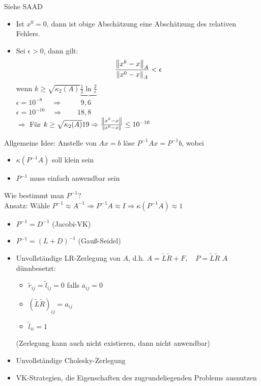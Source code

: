 \beweis Siehe SAAD
\begin{itemize}
  \item Ist $x^0 = 0$, dann ist obige Abschätzung eine Abschätzung des relativen Fehlers.
  \item Sei $\epsilon > 0$, dann gilt:
  \begin{align*}
    \frac{\left\lVert x^k - x \right\rVert_A}{\left\lVert x^0 - x \right\rVert_A} < \epsilon
  \end{align*}
  wenn $k \geq \sqrt{\kappa_2(A)} \underbrace{\frac{1}{2} \ln \frac{2}{\epsilon}}$\\
  $\epsilon = 10^{-8} \;\quad\Rightarrow\qquad \;\;9,6$\\
  $\epsilon = 10^{-16} \quad\Rightarrow\qquad 18,8$\\
  $\Rightarrow$ Für $k \geq \sqrt{\kappa_2(A)}19 \Rightarrow \frac{\left\lVert x^k - x \right\rVert}{\left\lVert x^0 - x \right\rVert} \leq 10^{-16}$
\end{itemize}
Allgemeine Idee: Anstelle von $Ax = b$ löse $P^{-1}Ax = P^{-1}b$, wobei
\begin{itemize}
  \item $\kappa(P^{-1}A)$ soll klein sein
  \item $P^{-1}$ muss einfach anwendbar sein
\end{itemize}
Wie bestimmt man $P^{-1}$?\\
Ansatz: Wähle $P^{-1}\approx A^{-1} \Rightarrow P^{-1}A \approx I \Rightarrow \kappa(P^{-1}A) \approx 1$
\begin{itemize}
  \item $P^{-1} = D^{-1}$ (Jacobi-VK)
  \item $P^{-1} = (L + D)^{-1}$ (Gauß-Seidel)
  \item Unvollständige LR-Zerlegung von $A$, d.h. $A = \tilde{L}\tilde{R} + F, \quad P = \tilde{L}\tilde{R}$ $A$ dünnbesetzt:
    \begin{itemize}
      \item $\tilde{r}_{ij} = \tilde{l}_{ij} = 0$ falls $a_{ij} = 0$
      \item $(\tilde{L}\tilde{R})_{ij} = a_{ij}$
      \item $\tilde{l}_{ii} = 1$
    \end{itemize}
    (Zerlegung kann auch nicht existieren, dann nicht anwendbar)\\
  \item Unvollständige Cholesky-Zerlegung 
  \item VK-Strategien, die Eigenschaften des zugrundeliegenden Problems ausnutzen
\end{itemize}

